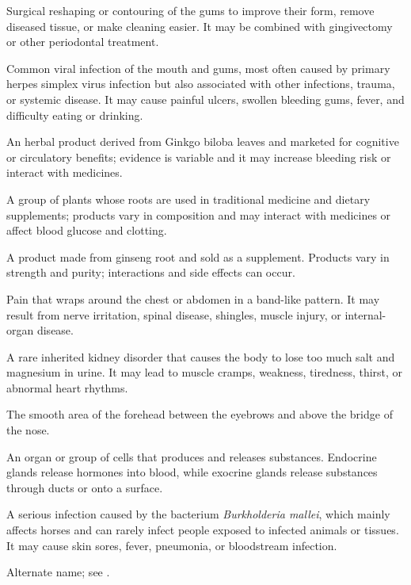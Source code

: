  Surgical reshaping or contouring of the gums to improve their form, remove diseased tissue, or make cleaning easier. It may be combined with gingivectomy or other periodontal treatment.

 Common viral infection of the mouth and gums, most often caused by primary herpes simplex virus infection but also associated with other infections, trauma, or systemic disease. It may cause painful ulcers, swollen bleeding gums, fever, and difficulty eating or drinking.

 An herbal product derived from Ginkgo biloba leaves and marketed for cognitive or circulatory benefits; evidence is variable and it may increase bleeding risk or interact with medicines.

 A group of plants whose roots are used in traditional medicine and dietary supplements; products vary in composition and may interact with medicines or affect blood glucose and clotting.

 A product made from ginseng root and sold as a supplement. Products vary in strength and purity; interactions and side effects can occur.

 Pain that wraps around the chest or abdomen in a band-like pattern. It may result from nerve irritation, spinal disease, shingles, muscle injury, or internal-organ disease.

 A rare inherited kidney disorder that causes the body to lose too much salt and magnesium in urine. It may lead to muscle cramps, weakness, tiredness, thirst, or abnormal heart rhythms.

 The smooth area of the forehead between the eyebrows and above the bridge of the nose.

 An organ or group of cells that produces and releases substances. Endocrine glands release hormones into blood, while exocrine glands release substances through ducts or onto a surface.

 A serious infection caused by the bacterium \textit{Burkholderia mallei}, which mainly affects horses and can rarely infect people exposed to infected animals or tissues. It may cause skin sores, fever, pneumonia, or bloodstream infection.

 Alternate name; see .

